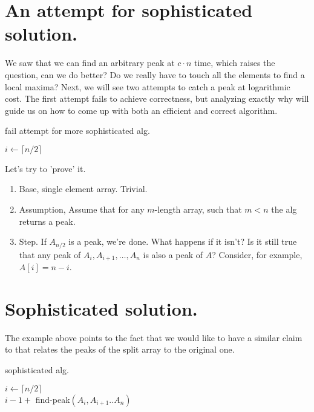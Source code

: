 \section{An attempt for sophisticated solution.}
We saw that we can find an arbitrary peak at $c\cdot n$ time, which raises the question, can we do better? Do we really have to touch all the elements to find a local maxima? Next, we will see two attempts to catch a peak at logarithmic cost. The first attempt fails to achieve correctness, but analyzing exactly why will guide us on how to come up with both an efficient and correct algorithm.
\begin{algorithm}
\caption{fail attempt for more sophisticated alg. }
        $ i \leftarrow  \lceil n/2 \rceil $\\
\end{algorithm}

Let's try to 'prove' it.  
\begin{enumerate}
 \item Base, single element array. Trivial. 
  \item Assumption, Assume that for any $m$-length array, such that $m<n$ the alg returns a peak. 
  \item Step. If $A_{n/2}$ is a peak, we're done. What happens if it isn't? Is it still true that any peak of $A_{i},A_{i+1}, \ldots, A_{n}$ is also a peak of $A$? Consider, for example, $A[i] = n - i$.
\end{enumerate}

\section{Sophisticated solution.}
The example above points to the fact that we would like to have a similar claim to  that relates the peaks of the split array to the original one.
\begin{algorithm}
\caption{sophisticated alg.}
$ i \leftarrow  \lceil n/2 \rceil $\\
         { 
          \Return $i -1 + $ find-peak$\left(A_{i},A_{i+1}..A_{n}\right)$
        }
\end{algorithm}


